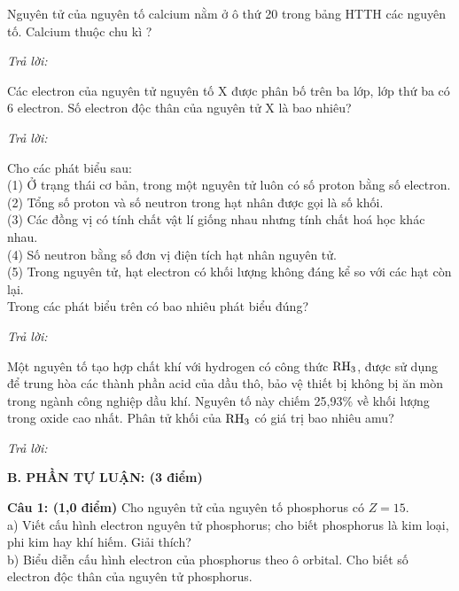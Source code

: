 \documentclass[11pt,a4paper]{article}
\begin{document}
\begin{ex}
Nguyên tử của nguyên tố calcium nằm ở ô thứ 20 trong bảng HTTH các nguyên tố. Calcium thuộc chu kì ?

\noindent\textit{Trả lời:} \dotfill
\end{ex}
\begin{ex}
Các electron của nguyên tử nguyên tố X được phân bố trên ba lớp, lớp thứ ba có 6 electron. Số electron độc thân của nguyên tử X là bao nhiêu?

\noindent\textit{Trả lời:} \dotfill
\end{ex}
\begin{ex}
Cho các phát biểu sau:\\
(1) Ở trạng thái cơ bản, trong một nguyên tử luôn có số proton bằng số electron.\\
(2) Tổng số proton và số neutron trong hạt nhân được gọi là số khối.\\
(3) Các đồng vị có tính chất vật lí giống nhau nhưng tính chất hoá học khác nhau.\\
(4) Số neutron bằng số đơn vị điện tích hạt nhân nguyên tử.\\
(5) Trong nguyên tử, hạt electron có khối lượng không đáng kể so với các hạt còn lại.\\
Trong các phát biểu trên có bao nhiêu phát biểu đúng?

\noindent\textit{Trả lời:} \dotfill
\end{ex}
\begin{ex}
Một nguyên tố tạo hợp chất khí với hydrogen có công thức $\ce{RH3}$, được sử dụng để trung hòa các thành phần acid của dầu thô, bảo vệ thiết bị không bị ăn mòn trong ngành công nghiệp dầu khí. Nguyên tố này chiếm 25,93\% về khối lượng trong oxide cao nhất. Phân tử khối của $\ce{RH3}$ có giá trị bao nhiêu amu?

\noindent\textit{Trả lời:} \dotfill
\end{ex}
\vspace{6pt}
\noindent
{\color{mainGreen}\textbf{\Large B. PHẦN TỰ LUẬN: (3 điểm)}}
\vspace{2pt}

\noindent
\textbf{Câu 1: (1,0 điểm)} Cho nguyên tử của nguyên tố phosphorus có $Z = 15$.\\
a) Viết cấu hình electron nguyên tử phosphorus; cho biết phosphorus là kim loại, phi kim hay khí hiếm. Giải thích?\\
b) Biểu diễn cấu hình electron của phosphorus theo ô orbital. Cho biết số electron độc thân của nguyên tử phosphorus.
\end{document}
